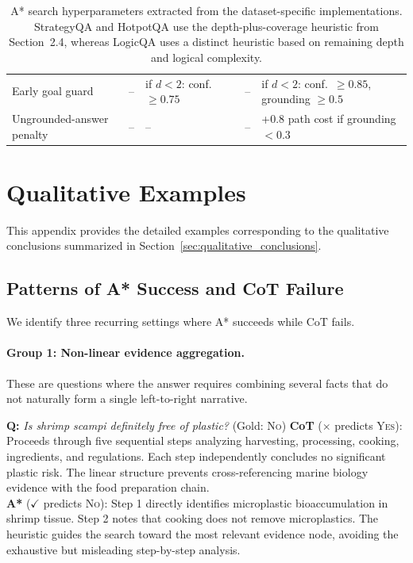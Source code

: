 \documentclass[11pt]{article}
\begin{document}
\begin{table}
\begin{tabular}{p{3.6cm} c p{4.2cm} p{4.2cm} p{4.6cm}}
Early goal guard 
& -- 
& if $d<2$: conf.\ $\ge 0.75$ 
& -- 
& if $d<2$: conf.\ $\ge 0.85$, grounding $\ge 0.5$ \\

Ungrounded-answer penalty 
& -- 
& -- 
& -- 
& +0.8 path cost if grounding $<0.3$ \\

\bottomrule
\end{tabular}
\caption{A* search hyperparameters extracted from the dataset-specific implementations. StrategyQA and HotpotQA use the depth-plus-coverage heuristic from Section~2.4, whereas LogicQA uses a distinct heuristic based on remaining depth and logical complexity.}
\label{tab:astar_hyperparameters}
\end{table}

\section{Qualitative Examples}
\label{app:qualitative_examples}

This appendix provides the detailed examples corresponding to the qualitative conclusions summarized in Section~\ref{sec:qualitative_conclusions}.

\subsection{Patterns of A* Success and CoT Failure}
\label{app:astar_success}

We identify three recurring settings where A* succeeds while CoT fails.

\paragraph{Group 1: Non-linear evidence aggregation.}
These are questions where the answer requires combining several facts that do not naturally form a single left-to-right narrative.

\begin{examplebox}[title=StrategyQA --- Non-linear Evidence Aggregation]
\textbf{Q:} \emph{Is shrimp scampi definitely free of plastic?} \quad (Gold: \textsc{No})
\tcblower
\textbf{CoT} ($\times$ predicts \textsc{Yes}): Proceeds through five sequential steps analyzing harvesting, processing, cooking, ingredients, and regulations. Each step independently concludes no significant plastic risk. The linear structure prevents cross-referencing marine biology evidence with the food preparation chain.\\[4pt]
\textbf{A*} ($\checkmark$ predicts \textsc{No}): Step 1 directly identifies microplastic bioaccumulation in shrimp tissue. Step 2 notes that cooking does not remove microplastics. The heuristic guides the search toward the most relevant evidence node, avoiding the exhaustive but misleading step-by-step analysis.
\end{examplebox}
\end{document}

